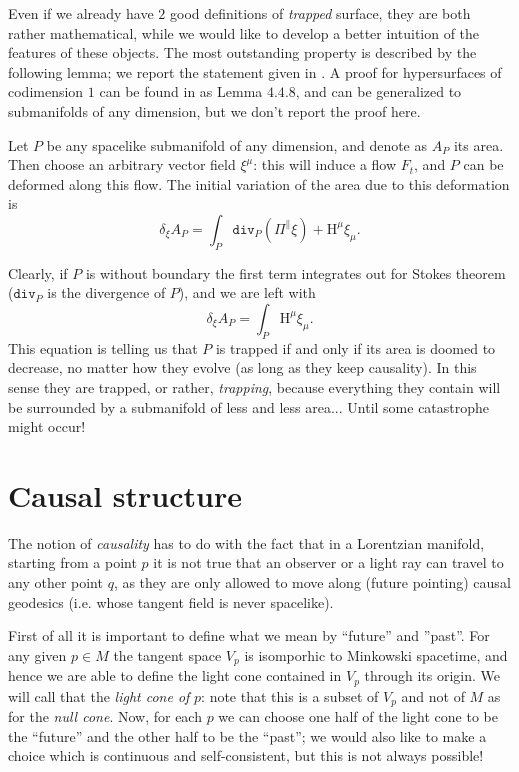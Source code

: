 Even if we already have \(2\) good definitions of \emph{trapped} surface, they are both rather mathematical, while we would like to develop a better intuition of the features of these objects. The most outstanding property is described by the following lemma; we report the statement given in \cite{senovilla2022critical}. A proof for hypersurfaces of codimension \(1\) can be found in \cite{kriele1999spacetime} as Lemma \(4.4.8\), and can be generalized to submanifolds of any dimension, but we don't report the proof here.
\begin{lemma}
	\label{lemma:variation-area}
	Let \(P\) be any spacelike submanifold of any dimension, and denote as \(A_P\) its area. Then choose an arbitrary vector field \(\xi^{\mu}\): this will induce a flow \(F_t\), and \(P\) can be deformed along this flow. The initial variation of the area due to this deformation is
	\[
	\delta_{\xi}A_P = \int_{P} \texttt{div}_P (\Pi^{\parallel}\xi) + \mathrm{H}^{\mu}\xi_{\mu}.
	\]
\end{lemma}
 Clearly, if \(P\) is without boundary the first term integrates out for Stokes theorem (\(\texttt{div}_P\) is the divergence of \(P\)), and we are left with
 \begin{equation}
 	\label{eq:variation-area}
 	\delta_{\xi}A_P = \int_{P} \mathrm{H}^{\mu}\xi_{\mu}.
 \end{equation}
	This equation is telling us that \(P\) is trapped if and only if its area is doomed to decrease, no matter how they evolve (as long as they keep causality). In this sense they are trapped, or rather, \emph{trapping}, because everything they contain will be surrounded by a submanifold of less and less area... Until some catastrophe might occur!

\section{Causal structure}

The notion of \emph{causality} has to do with the fact that in a Lorentzian manifold, starting from a  point \(p\) it is not true that an observer or a light ray can travel to any other point \(q\), as they are only allowed to move along (future pointing) causal geodesics (i.e. whose tangent field is never spacelike).

First of all it is important to define what we mean by ``future'' and ''past''. For any given \(p\in M\) the tangent space \(V_p\) is isomporhic to Minkowski spacetime, and hence we are able to define the light cone contained in \(V_p\) through its origin. We will call that the \emph{light cone of} \(p\): note that this is a subset of \(V_p\) and not of \(M\) as for the \emph{null cone}.
Now, for each \(p\) we can choose one half of the light cone to be the ``future'' and the other half to be the ``past''; we would also like to make a choice which is continuous and self-consistent, but this is not always possible!


